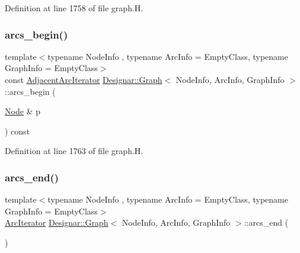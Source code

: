 Definition at line 1758 of file graph.\+H.

\mbox{\label{class_designar_1_1_graph_a2c527f6bddb0ff454fd6139f2437c27b}} 
\subsubsection{\texorpdfstring{arcs\+\_\+begin()}{arcs\_begin()}\hspace{0.1cm}{\footnotesize\ttfamily [4/4]}}
{\footnotesize\ttfamily template$<$typename Node\+Info , typename Arc\+Info  = Empty\+Class, typename Graph\+Info  = Empty\+Class$>$ \\
const \hyperlink{class_designar_1_1_graph_1_1_adjacent_arc_iterator}{Adjacent\+Arc\+Iterator} \hyperlink{class_designar_1_1_graph}{Designar\+::\+Graph}$<$ Node\+Info, Arc\+Info, Graph\+Info $>$\+::arcs\+\_\+begin (\begin{DoxyParamCaption}\item[{\hyperlink{class_designar_1_1_graph_a5dfc7dba9d092ac489c72e40390c37d0}{Node} \&}]{p }\end{DoxyParamCaption}) const\hspace{0.3cm}{\ttfamily [inline]}}



Definition at line 1763 of file graph.\+H.

\mbox{\label{class_designar_1_1_graph_a57a43c94f28df5958e912554d640bdaa}} 
\subsubsection{\texorpdfstring{arcs\+\_\+end()}{arcs\_end()}\hspace{0.1cm}{\footnotesize\ttfamily [1/4]}}
{\footnotesize\ttfamily template$<$typename Node\+Info , typename Arc\+Info  = Empty\+Class, typename Graph\+Info  = Empty\+Class$>$ \\
\hyperlink{class_designar_1_1_graph_1_1_arc_iterator}{Arc\+Iterator} \hyperlink{class_designar_1_1_graph}{Designar\+::\+Graph}$<$ Node\+Info, Arc\+Info, Graph\+Info $>$\+::arcs\+\_\+end (\begin{DoxyParamCaption}{ }\end{DoxyParamCaption})\hspace{0.3cm}{\ttfamily [inline]}}



